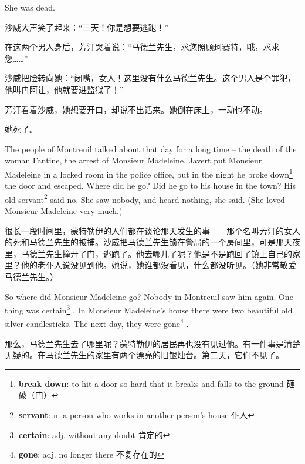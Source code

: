 \documentclass[fontset=ubuntu, zihao=5]{ctexart}
\begin{document}
\begin{paracol}{2}
  She was dead.


  \switchcolumn

  沙威大声笑了起来：“三天！你是想要逃跑！”

  在这两个男人身后，芳汀哭着说：“马德兰先生，求您照顾珂赛特，哦，求求您……”


  沙威把脸转向她：“闭嘴，女人！这里没有什么马德兰先生。这个男人是个罪犯，他叫冉阿让，他就要进监狱了！”


  芳汀看着沙威，她想要开口，却说不出话来。她倒在床上，一动也不动。


  她死了。

  \switchcolumn*

  The people of Montreuil talked about that day for a long time – the death of the woman Fantine, the arrest of Monsieur Madeleine. Javert put Monsieur Madeleine in a locked room in the police office, but in the night he broke down\footnote{\textbf{break down}: to hit a door so hard that it breaks and falls to the ground 砸破（门）}
  the door and escaped. Where did he go? Did he go to his house in the town? His old servant\footnote{\textbf{servant}: n. a person who works in another person's house 仆人}
  said no. She saw nobody, and heard nothing, she said. (She loved Monsieur Madeleine very much.)

  \switchcolumn

  很长一段时间里，蒙特勒伊的人们都在谈论那天发生的事——那个名叫芳汀的女人的死和马德兰先生的被捕。沙威把马德兰先生锁在警局的一个房间里，可是那天夜里，马德兰先生撞开了门，逃跑了。他去哪儿了呢？他是不是跑回了镇上自己的家里？他的老仆人说没见到他。她说，她谁都没看见，什么都没听见。（她非常敬爱马德兰先生。）

  \switchcolumn*

  So where did Monsieur Madeleine go? Nobody in Montreuil saw him again. One thing was certain\footnote{\textbf{certain}: adj. without any doubt 肯定的}
  . In Monsieur Madeleine's house there were two beautiful old silver candlesticks. The next day, they were gone\footnote{\textbf{gone}:  adj. no longer there 不复存在的}
  .

  \switchcolumn

  那么，马德兰先生去了哪里呢？蒙特勒伊的居民再也没有见过他。有一件事是清楚无疑的。在马德兰先生的家里有两个漂亮的旧银烛台。第二天，它们不见了。

\end{paracol}

\clearpage
\end{document}
